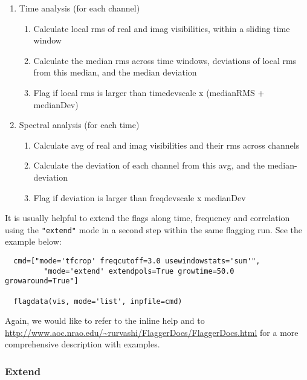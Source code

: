 \begin{enumerate}
\item Time analysis (for each channel)
  \begin{enumerate}
      \item Calculate local rms of real and imag visibilities, within a sliding time window
      \item Calculate the median rms across time windows, deviations of local rms from this median, and the median deviation
      \item Flag if local rms is larger than timedevscale x (medianRMS + medianDev)
   \end{enumerate}
\item Spectral analysis (for each time)
   \begin{enumerate}
       \item Calculate avg of real and imag visibilities and their rms across channels
       \item Calculate the deviation of each channel from this avg, and the median-deviation
       \item Flag if deviation is larger than freqdevscale x medianDev
   \end{enumerate}
\end{enumerate}

It is usually helpful to extend the flags along time, frequency and
correlation using the {\tt "extend"}
mode in a second step within the same flagging run. See the example
below:

\small
\begin{verbatim}
  cmd=["mode='tfcrop' freqcutoff=3.0 usewindowstats='sum'", 
         "mode='extend' extendpols=True growtime=50.0 growaround=True"]
                     
  flagdata(vis, mode='list', inpfile=cmd)     
\end{verbatim}
\normalsize

       Again, we would like to refer to the inline help and to
       \url{http://www.aoc.nrao.edu/~rurvashi/FlaggerDocs/FlaggerDocs.html}
       for a more comprehensive description with examples.


\subsubsection{Extend}
\label{section:edit.flagdata.mode.extend}

